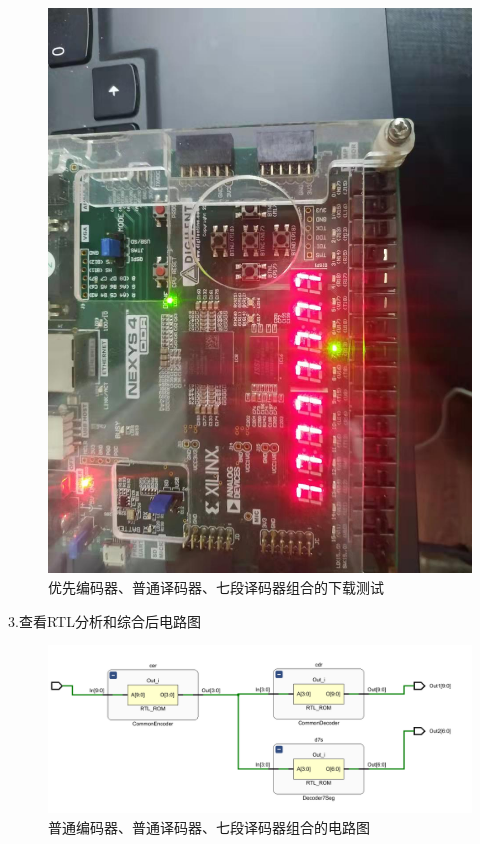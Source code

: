 \documentclass[UTF8,fontset=fandol]{ctexart}
\begin{document}
\begin{figure}[H]
    \centering
    \includegraphics[scale=0.2]{微信图片_20211103201941.jpg}
    \caption{优先编码器、普通译码器、七段译码器组合的下载测试}
\end{figure}

3.查看RTL分析和综合后电路图

\begin{figure}[H]
    \centering
    \includegraphics[scale=0.6]{Snipaste_2021-11-03_19-23-32.png}
    \caption{普通编码器、普通译码器、七段译码器组合的电路图}
\end{figure}
\end{document}
